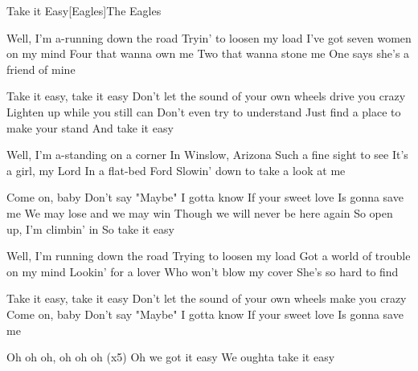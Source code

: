 \begin{Song}{Take it Easy}[Eagles]{The Eagles}
\begin{multicols}{2}

\begin{Verse}
Well, I'm a-running down the road
Tryin' to loosen my load
I've got seven women on my mind
Four that wanna own me
Two that wanna stone me
One says she's a friend of mine
\end{Verse}
\espaceInterStrophe

\begin{Chorus}
Take it easy, take it easy
Don't let the sound of your own wheels drive you crazy
Lighten up while you still can
Don't even try to understand
Just find a place to make your stand
And take it easy
\end{Chorus}
\espaceInterStrophe

\begin{Verse}
Well, I'm a-standing on a corner
In Winslow, Arizona
Such a fine sight to see
It's a girl, my Lord
In a flat-bed Ford
Slowin' down to take a look at me
\vfill
\columnbreak
\end{Verse}
\espaceInterStrophe

\begin{Chorus}
Come on, baby
Don't say "Maybe"
I gotta know
If your sweet love
Is gonna save me
We may lose and we may win
Though we will never be here again
So open up, I'm climbin' in
So take it easy

\end{Chorus}
\espaceInterStrophe

\begin{Verse}
Well, I'm running down the road
Trying to loosen my load
Got a world of trouble on my mind
Lookin' for a lover
Who won't blow my cover
She's so hard to find
\end{Verse}
\espaceInterStrophe

\begin{Chorus}
Take it easy, take it easy
Don't let the sound of your own wheels make you crazy
Come on, baby
Don't say "Maybe"
I gotta know
If your sweet love
Is gonna save me
\end{Chorus}
\espaceInterStrophe

\begin{Chorus}
Oh oh oh, oh oh oh (x5)
Oh we got it easy
We oughta take it easy
\end{Chorus}

\end{multicols}

\vfill


\end{Song}
